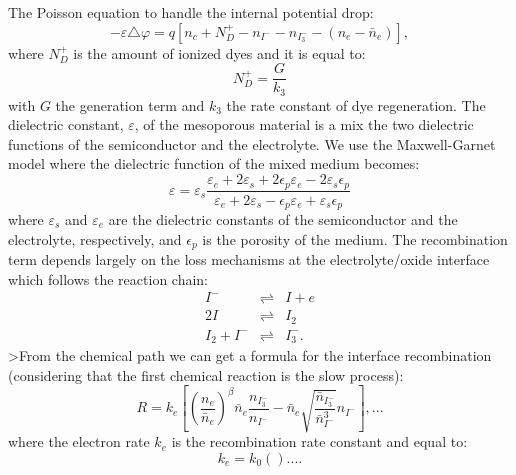 The Poisson equation to handle the internal
potential drop:
\begin{equation}\label{poisson}
    -\varepsilon\triangle \varphi =  q[n_{c} + N_{D}^{+} - n_{I^{-}} - n_{I_{3}^{-}} - (n_{e} -
    \bar{n}_{e})],
\end{equation}
where $N^{+}_{D}$ is the amount of ionized dyes and it is equal
to:
\begin{equation}\label{dyeion}
    N_{D}^{+} = \frac{G}{k_{3}}
\end{equation}
with $G$ the generation term and $k_{3}$ the rate constant of dye
regeneration. The dielectric constant, $\varepsilon$, of the
mesoporous material is a mix the two dielectric functions of the
semiconductor and the electrolyte. We use the Maxwell-Garnet model
where the dielectric function of the mixed medium becomes:
\begin{equation}\label{diel}
    \varepsilon = \varepsilon_{s}\frac{\varepsilon_{e} + 2\varepsilon_{s} + 2\epsilon_{p}\varepsilon_{e} - 2\varepsilon_{s}\epsilon_{p}}
    {\varepsilon_{e} + 2\varepsilon_{s} -\epsilon_{p}\varepsilon_{e} +\varepsilon_{s}\epsilon_{p}}
\end{equation}
where $\varepsilon_{s}$ and $\varepsilon_{e}$ are the dielectric
constants of the semiconductor and the electrolyte, respectively,
and $\epsilon_{p}$ is the porosity of the medium. The
recombination term depends largely on the loss mechanisms at the
electrolyte/oxide interface which follows the reaction chain:
\begin{eqnarray}
   I^{-} & \rightleftharpoons & I + e \\
   2I & \rightleftharpoons & I_{2} \\
   I_{2} + I^{-} & \rightleftharpoons & I^{-}_{3}.
\label{reaction_loss}
\end{eqnarray}
>From the chemical path we can get a formula for the interface
recombination (considering that the first chemical reaction is the
slow process):
\begin{equation}\label{ricombinazione}
    R = k_{e} \left [  \left ( \frac{n_{e}}{\bar{n}_{e}} \right )^{\beta}\bar{n}_{e}\frac{n_{I^{-}_{3}}}{n_{I^{-}}}
    - \bar{n}_{e}\sqrt{\frac{\bar{n}_{I^{-}_{3}}}{\bar{n}^{3}_{I^{-}}}} n_{I^{-}}\right
    ], ...
\end{equation}
where the electron rate $k_{e}$ is the recombination rate
constant and equal to:
\begin{equation}\label{ricombinazione2}
   k_e = k_0 \left ( \right) ....
\end{equation}
